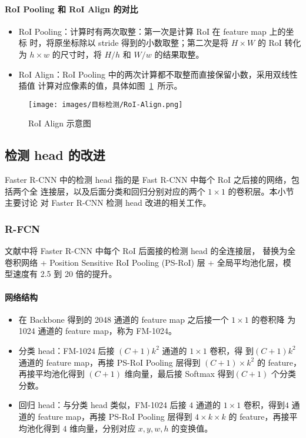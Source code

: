 \paragraph{RoI Pooling 和 RoI Align 的对比}

\begin{itemize}
  \item RoI Pooling：计算时有两次取整：第一次是计算 RoI 在 feature map 上的坐标
    时，将原坐标除以 stride 得到的小数取整；第二次是将 $H \times W$ 的 RoI 转化为 $h
    \times w$ 的尺寸时，将 $H/h$ 和 $W/w$ 的结果取整。
  \item RoI Align：RoI Pooling 中的两次计算都不取整而直接保留小数，采用双线性插值
    计算对应像素的值，具体如图~\ref{fig:roi-align}~所示。
\end{itemize}

\begin{figure}[ht]
  \centering
  \texttt{[image: images/目标检测/RoI-Align.png]}
  \caption{RoI Align 示意图}\label{fig:roi-align}
\end{figure}

\subsection{检测 head 的改进}
Faster R-CNN 中的检测 head 指的是 Fast R-CNN 中每个 RoI 之后接的网络，包括两个全
连接层，以及后面分类和回归分别对应的两个 $1 \times 1$ 的卷积层。本小节主要讨论
对 Faster R-CNN 检测 head 改进的相关工作。

\subsubsection{R-FCN}
文献中将 Faster R-CNN 中每个 RoI 后面接的检测 head 的全连接层，
替换为全卷积网络 + Position Sensitive RoI Pooling (PS-RoI) 层 + 全局平均池化层，模
型速度有 2.5 到 20 倍的提升。

\paragraph{网络结构}

\begin{itemize}
  \item 在 Backbone 得到的 2048 通道的 feature map 之后接一个 $1 \times 1$ 的卷积降
    为 1024 通道的 feature map，称为 FM-1024。
  \item 分类 head：FM-1024 后接 $(C+1)k^2$ 通道的 $1 \times 1$ 卷积，得
    到$(C+1)k^2$ 通道的 feature map，再接 PS-RoI Pooling 层得到 $(C+1) \times
    k^2$ 的 feature，再接平均池化得到 $(C+1)$ 维向量，最后接 Softmax 得到$(C+1)$
    个分类分数。
  \item 回归 head：与分类 head 类似，FM-1024 后接 $4$ 通道的 $1 \times 1$
    卷积，得到$4$ 通道的 feature map，再接 PS-RoI Pooling 层得到 $4
    \times k \times k$ 的 feature，再接平均池化得到 $4$ 维向量，分别对应 $x, y,
    w, h$ 的变换值。
\end{itemize}

